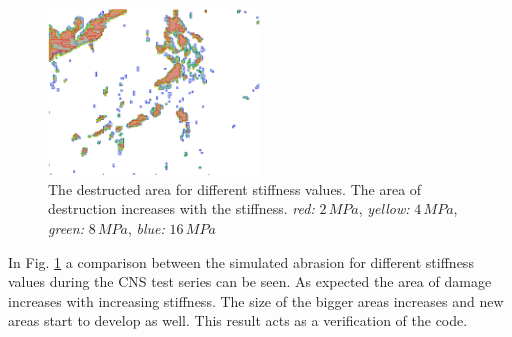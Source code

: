 \begin{figure}[!ht]
\begin{center}
\includegraphics[width=0.5\textwidth]{./figures/MEX3-2_AbrasionDiffStiffness.PNG}
\end{center}
\caption{The destructed area for different stiffness values. The area of destruction increases with the stiffness. \textit{red:} $2\, \unit{MPa}$, \textit{yellow:} $4\, \unit{MPa}$, \textit{green:} $8\, \unit{MPa}$, \textit{blue:} $16\,\unit{MPa}$}
\label{fig:MEX3-2_AbrasionStiffness}
\end{figure}

In Fig. \ref{fig:MEX3-2_AbrasionStiffness} a comparison between the simulated abrasion for different stiffness values during the CNS test series can be seen. As expected the area of damage increases with increasing stiffness. The size of the bigger areas increases and new areas start to develop as well. This result acts as a verification of the code.\\


